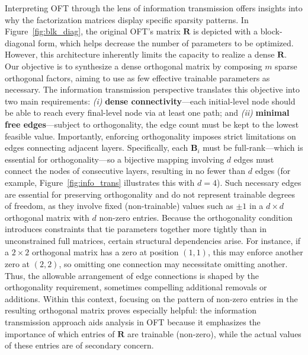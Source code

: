 Interpreting OFT through the lens of information transmission offers insights into why the factorization matrices display specific sparsity patterns. In Figure~\ref{fig:blk_diag}, the original OFT’s matrix $\bm{R}$ is depicted with a block-diagonal form, which helps decrease the number of parameters to be optimized. However, this architecture inherently limits the capacity to realize a dense $\bm{R}$. Our objective is to synthesize a dense orthogonal matrix by composing $m$ sparse orthogonal factors, aiming to use as few effective trainable parameters as necessary. The information transmission perspective translates this objective into two main requirements: \emph{(i)} \textbf{dense connectivity}—each initial-level node should be able to reach every final-level node via at least one path; and \emph{(ii)} \textbf{minimal free edges}—subject to orthogonality, the edge count must be kept to the lowest feasible value. Importantly, enforcing orthogonality imposes strict limitations on edges connecting adjacent layers. Specifically, each $\bm{B}_i$ must be full-rank—which is essential for orthogonality—so a bijective mapping involving $d$ edges must connect the nodes of consecutive layers, resulting in no fewer than $d$ edges (for example, Figure~\ref{fig:info_trans} illustrates this with $d=4$). Such necessary edges are essential for preserving orthogonality and do not represent trainable degrees of freedom, as they involve fixed (non-trainable) values such as $\pm 1$ in a $d\times d$ orthogonal matrix with $d$ non-zero entries. Because the orthogonality condition introduces constraints that tie parameters together more tightly than in unconstrained full matrices, certain structural dependencies arise. For instance, if a $2\times 2$ orthogonal matrix has a zero at position $(1,1)$, this may enforce another zero at $(2,2)$, so omitting one connection may necessitate omitting another. Thus, the allowable arrangement of edge connections is shaped by the orthogonality requirement, sometimes compelling additional removals or additions. Within this context, focusing on the pattern of non-zero entries in the resulting orthogonal matrix proves especially helpful: the information transmission approach aids analysis in OFT because it emphasizes the importance of which entries of $\bm{R}$ are trainable (non-zero), while the actual values of these entries are of secondary concern.

